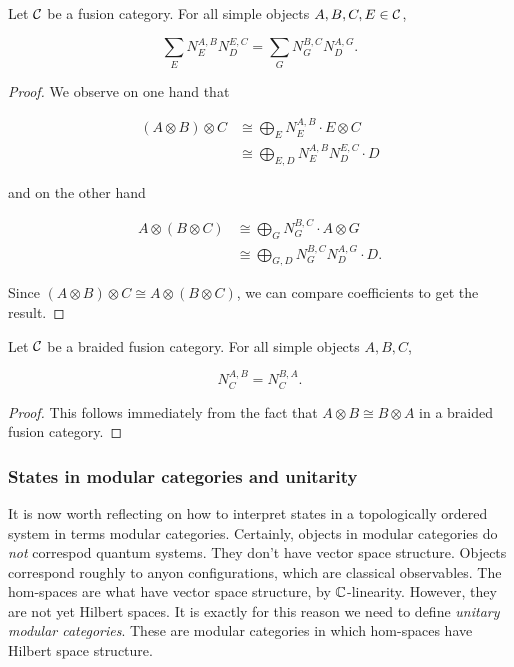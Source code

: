 \begin{prop} Let ${\mathcal C}$ be a fusion category. For all simple objects $A,B,C,E\in {\mathcal C}$,

\begin{equation}
\sum_{E}N^{A,B}_{E}N^{E,C}_{D}=\sum_{G}N^{B,C}_{G}N^{A,G}_{D}.
\end{equation}
\end{prop}
\begin{proof} We observe on one hand that

\begin{align*}
(A\otimes B)\otimes C& \cong \bigoplus_{E}N^{A,B}_{E}\cdot E\otimes C\\
&\cong \bigoplus_{E,D}N^{A,B}_{E}N^{E,C}_{D}\cdot D
\end{align*}

and on the other hand

\begin{align*}
A\otimes (B\otimes C)& \cong \bigoplus_{G}N^{B,C}_{G}\cdot A\otimes G\\
&\cong \bigoplus_{G,D}N^{B,C}_{G}N^{A,G}_{D}\cdot D.
\end{align*}

Since $(A\otimes B)\otimes C\cong A\otimes (B\otimes C)$, we can compare coefficients to get the result.
\end{proof}

\begin{prop} Let ${\mathcal C}$ be a braided fusion category. For all simple objects $A,B,C$,

\begin{equation}
N^{A,B}_{C}=N^{B,A}_{C}.
\end{equation}
\end{prop}
\begin{proof} This follows immediately from the fact that $A\otimes B\cong B\otimes A$ in a braided fusion category.
\end{proof}


\subsubsection{States in modular categories and unitarity}

It is now worth reflecting on how to interpret states in a topologically ordered system in terms modular categories. Certainly, objects in modular categories do {\em not} correspod quantum systems. They don't have vector space structure. Objects correspond roughly to anyon configurations, which are classical observables. The hom-spaces are what have vector space structure, by ${\mathbb C}$-linearity. However, they are not yet Hilbert spaces. It is exactly for this reason we need to define {\em unitary modular categories}. These are modular categories in which hom-spaces have Hilbert space structure.

